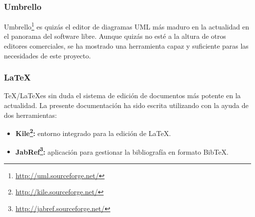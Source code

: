 \subsubsection{Umbrello}

Umbrello\footnote{\url{http://uml.sourceforge.net/}} es quizás el editor de
diagramas UML más maduro en la actualidad en el panorama del software libre.
Aunque quizás no esté a la altura de otros editores comerciales, se ha mostrado
una herramienta capaz y suficiente paras las necesidades de este proyecto.

\subsubsection{\LaTeX}

\TeX/\LaTeX es sin duda el sistema de edición de documentos más potente en la
actualidad. La presente documentación ha sido escrita utilizando \LaTeXe con
la ayuda de dos herramientas:

\begin{itemize}
  \item \textbf{Kile\footnote{\url{http://kile.sourceforge.net/}}:} entorno
	integrado para la edición de \LaTeX.
  \item \textbf{JabRef\footnote{\url{http://jabref.sourceforge.net/}}:} aplicación
	para gestionar la bibliografía en formato BibTeX.
\end{itemize}


